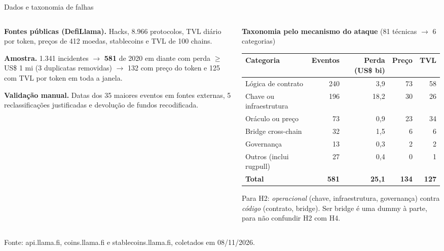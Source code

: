 \documentclass[aspectratio=169,10pt]{beamer}
\newcommand{\fonte}[1]{\par\vfill{\tiny\color{cinza}#1}}
\begin{document}
\begin{frame}{Dados e taxonomia de falhas}
\begin{columns}[T]
\begin{column}{0.44\textwidth}
\small
\textbf{Fontes públicas (DefiLlama).} Hacks, 8.966 protocolos, TVL diário por token, preços de 412 moedas, stablecoins e TVL de 100 chains.

\medskip
\textbf{Amostra.} 1.341 incidentes $\rightarrow$ \textbf{581} de 2020 em diante com perda $\geq$ US\$ 1 mi (3 duplicatas removidas) $\rightarrow$ 132 com preço do token e 125 com TVL por token em toda a janela.

\medskip
\textbf{Validação manual.} Datas dos 35 maiores eventos em fontes externas, 5 reclassificações justificadas e devolução de fundos recodificada.
\end{column}
\begin{column}{0.54\textwidth}
\scriptsize
\textbf{Taxonomia pelo mecanismo do ataque} (81 técnicas $\rightarrow$ 6 categorias)\\[2pt]
\begin{tabular}{@{}lrrrr@{}}
\toprule
Categoria & Eventos & Perda (US\$ bi) & Preço & TVL\\
\midrule
Lógica de contrato & 240 & 3,9 & 73 & 58\\
Chave ou infraestrutura & 196 & 18,2 & 30 & 26\\
Oráculo ou preço & 73 & 0,9 & 23 & 34\\
Bridge cross-chain & 32 & 1,5 & 6 & 6\\
Governança & 13 & 0,3 & 2 & 2\\
Outros (inclui rugpull) & 27 & 0,4 & 0 & 1\\
\midrule
\textbf{Total} & \textbf{581} & \textbf{25,1} & \textbf{134} & \textbf{127}\\
\bottomrule
\end{tabular}

\medskip
Para H2: \emph{operacional} (chave, infraestrutura, governança) contra \emph{código} (contrato, bridge). Ser bridge é uma dummy à parte, para não confundir H2 com H4.
\end{column}
\end{columns}
\fonte{Fonte: api.llama.fi, coins.llama.fi e stablecoins.llama.fi, coletados em 08/11/2026.}
\end{frame}
\end{document}
